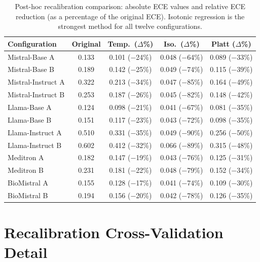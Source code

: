 \begin{table}[htbp]
    \centering
    \caption{Post-hoc recalibration comparison: absolute ECE values 
        and relative ECE reduction (as a percentage of the original 
        ECE). Isotonic regression is the strongest method for all 
        twelve configurations.}
    \label{tab:app-recalibration-full}
    \small
    \begin{tabular}{@{}lcccc@{}}
        \toprule
        \textbf{Configuration} & 
        \textbf{Original} & 
        \textbf{Temp.\ ($\Delta$\%)} & 
        \textbf{Iso.\ ($\Delta$\%)} & 
        \textbf{Platt ($\Delta$\%)} \\
        \midrule
        Mistral-Base A     & 0.133 & 0.101 ($-$24\%) & 0.048 ($-$64\%) & 0.089 ($-$33\%) \\
        Mistral-Base B     & 0.189 & 0.142 ($-$25\%) & 0.049 ($-$74\%) & 0.115 ($-$39\%) \\
        Mistral-Instruct A & 0.322 & 0.213 ($-$34\%) & 0.047 ($-$85\%) & 0.164 ($-$49\%) \\
        Mistral-Instruct B & 0.253 & 0.187 ($-$26\%) & 0.045 ($-$82\%) & 0.148 ($-$42\%) \\
        Llama-Base A       & 0.124 & 0.098 ($-$21\%) & 0.041 ($-$67\%) & 0.081 ($-$35\%) \\
        Llama-Base B       & 0.151 & 0.117 ($-$23\%) & 0.043 ($-$72\%) & 0.098 ($-$35\%) \\
        Llama-Instruct A   & 0.510 & 0.331 ($-$35\%) & 0.049 ($-$90\%) & 0.256 ($-$50\%) \\
        Llama-Instruct B   & 0.602 & 0.412 ($-$32\%) & 0.066 ($-$89\%) & 0.315 ($-$48\%) \\
        Meditron A         & 0.182 & 0.147 ($-$19\%) & 0.043 ($-$76\%) & 0.125 ($-$31\%) \\
        Meditron B         & 0.231 & 0.181 ($-$22\%) & 0.048 ($-$79\%) & 0.152 ($-$34\%) \\
        BioMistral A       & 0.155 & 0.128 ($-$17\%) & 0.041 ($-$74\%) & 0.109 ($-$30\%) \\
        BioMistral B       & 0.194 & 0.156 ($-$20\%) & 0.042 ($-$78\%) & 0.126 ($-$35\%) \\
        \bottomrule
    \end{tabular}
\end{table}

\section{Recalibration Cross-Validation Detail}
\label{sec:app-recalibration-cv}

